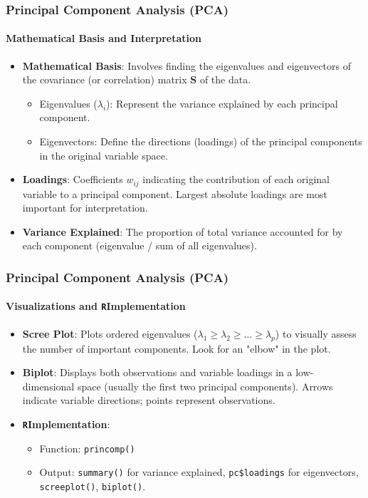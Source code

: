 \documentclass{beamer}
\newcommand{\R}{\texttt{R}}
\newcommand{\code}[1]{\texttt{#1}}
\begin{document}
\begin{frame}
    \frametitle{Principal Component Analysis (PCA)}
    \framesubtitle{Mathematical Basis and Interpretation}
    \begin{itemize}
        \item \textbf{Mathematical Basis}: Involves finding the \alert{eigenvalues} and \alert{eigenvectors} of the covariance (or correlation) matrix $\mathbf{S}$ of the data.
            \begin{itemize}
                \item Eigenvalues ($\lambda_i$): Represent the variance explained by each principal component.
                \item Eigenvectors: Define the directions (loadings) of the principal components in the original variable space.
            \end{itemize}
        \item \textbf{Loadings}: Coefficients $w_{ij}$ indicating the contribution of each original variable to a principal component. Largest absolute loadings are most important for interpretation.
        \item \textbf{Variance Explained}: The proportion of total variance accounted for by each component (eigenvalue / sum of all eigenvalues).
    \end{itemize}
\end{frame}

\begin{frame}
    \frametitle{Principal Component Analysis (PCA)}
    \framesubtitle{Visualizations and \R Implementation}
    \begin{itemize}
        \item \textbf{Scree Plot}: Plots ordered eigenvalues ($\lambda_1 \ge \lambda_2 \ge \dots \ge \lambda_p$) to visually assess the number of important components. Look for an "elbow" in the plot.
        \item \textbf{Biplot}: Displays both observations and variable loadings in a low-dimensional space (usually the first two principal components). Arrows indicate variable directions; points represent observations.
        \item \textbf{\R Implementation}:
            \begin{itemize}
        	\item Function: \code{princomp()}
            \item Output: \code{summary()} for variance explained, \code{pc\$loadings} for eigenvectors, \code{screeplot()}, \code{biplot()}.
            \end{itemize}
    \end{itemize}
\end{frame}
\end{document}
